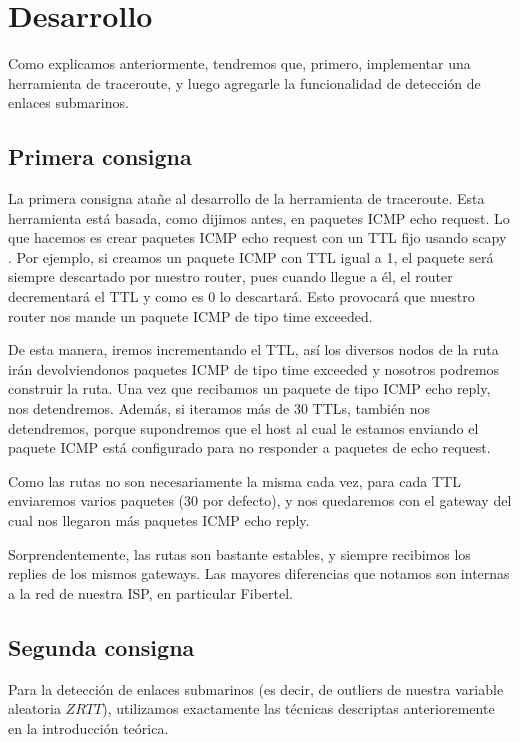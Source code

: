 \section{Desarrollo}

\PARstart Como explicamos anteriormente, tendremos que, primero, implementar una herramienta de traceroute, y luego agregarle la funcionalidad de detección de enlaces submarinos.

\subsection{Primera consigna}

La primera consigna atañe al desarrollo de la herramienta de traceroute. Esta herramienta está basada, como dijimos antes, en paquetes ICMP echo request. Lo que hacemos es crear paquetes ICMP echo request con un TTL fijo usando scapy \cite{scapy}. Por ejemplo, si creamos un paquete ICMP con TTL igual a 1, el paquete será siempre descartado por nuestro router, pues cuando llegue a él, el router decrementará el TTL y como es 0 lo descartará. Esto provocará que nuestro router nos mande un paquete ICMP de tipo time exceeded.

De esta manera, iremos incrementando el TTL, así los diversos nodos de la ruta irán devolviendonos paquetes ICMP de tipo time exceeded y nosotros podremos construir la ruta. Una vez que recibamos un paquete de tipo ICMP echo reply, nos detendremos. Además, si iteramos más de 30 TTLs, también nos detendremos, porque supondremos que el host al cual le estamos enviando el paquete ICMP está configurado para no responder a paquetes de echo request.

Como las rutas no son necesariamente la misma cada vez, para cada TTL enviaremos varios paquetes (30 por defecto), y nos quedaremos con el gateway del cual nos llegaron más paquetes ICMP echo reply.

Sorprendentemente, las rutas son bastante estables, y siempre recibimos los replies de los mismos gateways. Las mayores diferencias que notamos son internas a la red de nuestra ISP, en particular Fibertel.

\subsection{Segunda consigna}

Para la detección de enlaces submarinos (es decir, de outliers de nuestra variable aleatoria $ZRTT$), utilizamos exactamente las técnicas descriptas anterioremente en la introducción teórica.

